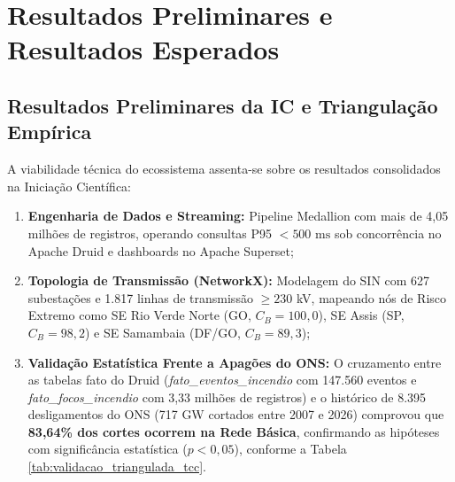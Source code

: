 \section{Resultados Preliminares e Resultados Esperados}
\label{sc:resultados}

\subsection{Resultados Preliminares da IC e Triangulação Empírica}
A viabilidade técnica do ecossistema assenta-se sobre os resultados consolidados na Iniciação Científica:
\begin{enumerate}
    \item \textbf{Engenharia de Dados e Streaming:} Pipeline Medallion com mais de 4,05 milhões de registros, operando consultas P95 $< 500\text{ ms}$ sob concorrência no Apache Druid e dashboards no Apache Superset;
    \item \textbf{Topologia de Transmissão (NetworkX):} Modelagem do SIN com 627 subestações e 1.817 linhas de transmissão $\ge 230$ kV, mapeando nós de Risco Extremo como SE Rio Verde Norte (GO, $C_B=100{,}0$), SE Assis (SP, $C_B=98{,}2$) e SE Samambaia (DF/GO, $C_B=89{,}3$);
    \item \textbf{Validação Estatística Frente a Apagões do ONS:} O cruzamento entre as tabelas fato do Druid (\textit{fato\_eventos\_incendio} com 147.560 eventos e \textit{fato\_focos\_incendio} com 3,33 milhões de registros) e o histórico de 8.395 desligamentos do ONS (717 GW cortados entre 2007 e 2026) comprovou que \textbf{83,64\% dos cortes ocorrem na Rede Básica}, confirmando as hipóteses com significância estatística ($p < 0{,}05$), conforme a Tabela \ref{tab:validacao_triangulada_tcc}.
\end{enumerate}

